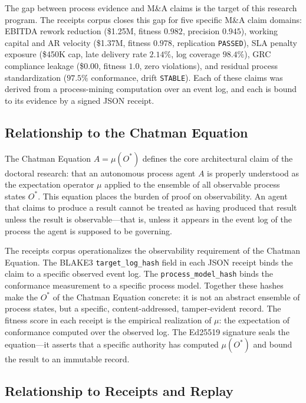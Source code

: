 The gap between process evidence and M\&A claims is the target of this research program.
The receipts corpus closes this gap for five specific M\&A claim domains: EBITDA rework
reduction (\$1.25M, fitness $0.982$, precision $0.945$), working capital and AR velocity
(\$1.37M, fitness $0.978$, replication \texttt{PASSED}), SLA penalty exposure (\$450K
cap, late delivery rate $2.14\%$, log coverage $98.4\%$), GRC compliance leakage
(\$0.00, fitness $1.0$, zero violations), and residual process standardization
($97.5\%$ conformance, drift \texttt{STABLE}). Each of these claims was derived from
a process-mining computation over an event log, and each is bound to its evidence by
a signed JSON receipt.

\subsection{Relationship to the Chatman Equation}
\label{sec:receipts-lineage-chatman}

The Chatman Equation $A = \mu(O^*)$ defines the core architectural claim of the doctoral
research: that an autonomous process agent $A$ is properly understood as the expectation
operator $\mu$ applied to the ensemble of all observable process states $O^*$. This equation
places the burden of proof on observability. An agent that claims to produce a result cannot
be treated as having produced that result unless the result is observable---that is, unless
it appears in the event log of the process the agent is supposed to be governing.

The receipts corpus operationalizes the observability requirement of the Chatman Equation.
The BLAKE3 \texttt{target\_log\_hash} field in each JSON receipt binds the claim to a
specific observed event log. The \texttt{process\_model\_hash} binds the conformance
measurement to a specific process model. Together these hashes make the $O^*$ of the
Chatman Equation concrete: it is not an abstract ensemble of process states, but a
specific, content-addressed, tamper-evident record. The fitness score in each receipt
is the empirical realization of $\mu$: the expectation of conformance computed over
the observed log. The Ed25519 signature seals the equation---it asserts that a
specific authority has computed $\mu(O^*)$ and bound the result to an immutable record.

\subsection{Relationship to Receipts and Replay}
\label{sec:receipts-lineage-replay}

